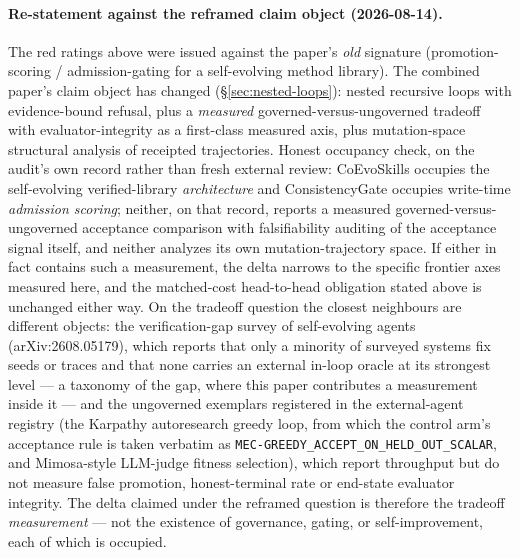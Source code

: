 \paragraph{Re-statement against the reframed claim object (2026-08-14).}
The red ratings above were issued against the paper's \emph{old} signature
(promotion-scoring / admission-gating for a self-evolving method library). The
combined paper's claim object has changed (\S\ref{sec:nested-loops}): nested recursive
loops with evidence-bound refusal, plus a \emph{measured} governed-versus-ungoverned
tradeoff with evaluator-integrity as a first-class measured axis, plus mutation-space
structural analysis of receipted trajectories. Honest occupancy check, on the audit's
own record rather than fresh external review: CoEvoSkills occupies the self-evolving
verified-library \emph{architecture} and ConsistencyGate occupies write-time
\emph{admission scoring}; neither, on that record, reports a measured
governed-versus-ungoverned acceptance comparison with falsifiability auditing of the
acceptance signal itself, and neither analyzes its own mutation-trajectory space. If
either in fact contains such a measurement, the delta narrows to the specific
frontier axes measured here, and the matched-cost head-to-head obligation stated
above is unchanged either way. On the tradeoff question the closest neighbours are
different objects: the verification-gap survey of self-evolving agents
(arXiv:2608.05179), which reports that only a minority of surveyed systems fix seeds
or traces and that none carries an external in-loop oracle at its strongest level ---
a taxonomy of the gap, where this paper contributes a measurement inside it --- and
the ungoverned exemplars registered in the external-agent registry (the Karpathy
autoresearch greedy loop, from which the control arm's acceptance rule is taken
verbatim as \texttt{MEC-GREEDY\_ACCEPT\_ON\_HELD\_OUT\_SCALAR}, and Mimosa-style
LLM-judge fitness selection), which report throughput but do not measure false
promotion, honest-terminal rate or end-state evaluator integrity. The delta claimed
under the reframed question is therefore the tradeoff \emph{measurement} --- not the
existence of governance, gating, or self-improvement, each of which is occupied.
